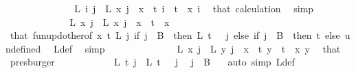 \begin{isabellebody}
\ \ \ \ \ \ \ \ \ \ \isamarkupfalse%
\ \isamarkupfalse%
\ \ {\isachardoublequoteopen}L\ i\ j\ {\isacharequal}{\kern0pt}\ L\ x\ j{\isachardoublequoteclose}\ \ {\isachardoublequoteopen}x\ {\isacharless}{\kern0pt}\ t{\isachardoublequoteclose}\ {\isachardoublequoteopen}i\ {\isacharless}{\kern0pt}\ t{\isachardoublequoteclose}\ \ x\ i\ \isamarkupfalse%
\ that\ calculation\ \isamarkupfalse%
\ simp\isanewline
\ \ \ \ \ \ \ \ \ \ \isamarkupfalse%
\ \isamarkupfalse%
\ {\isachardoublequoteopen}L{\isacharprime}{\kern0pt}\ x\ j\ {\isacharequal}{\kern0pt}\ L\ x\ j{\isachardoublequoteclose}\ \ {\isachardoublequoteopen}x\ {\isacharless}{\kern0pt}\ t{\isachardoublequoteclose}\ \ x\ \isamarkupfalse%
\ that\ fun{\isacharunderscore}{\kern0pt}upd{\isacharunderscore}{\kern0pt}other{\isacharbrackleft}{\kern0pt}of\ x\ t\ L\ {\isachardoublequoteopen}{\isasymlambda}j{\isachardot}{\kern0pt}\ if\ j\ {\isasymin}\ B\ {}\ then\ L\ {\isacharparenleft}{\kern0pt}t\ {\isacharminus}{\kern0pt}\ {}{\isacharparenright}{\kern0pt}\ j\ else\ if\ j\ {\isasymin}\ B\ {}\ then\ t\ else\ undefined{\isachardoublequoteclose}{\isacharbrackright}{\kern0pt}\ \isamarkupfalse%
\ L{\isacharprime}{\kern0pt}{\isacharunderscore}{\kern0pt}def\ \isamarkupfalse%
\ simp\isanewline
\ \ \ \ \ \ \ \ \ \ \isamarkupfalse%
\ \isamarkupfalse%
\ {\isacharasterisk}{\kern0pt}{\isacharcolon}{\kern0pt}\ {\isachardoublequoteopen}L{\isacharprime}{\kern0pt}\ x\ j\ {\isacharequal}{\kern0pt}\ L{\isacharprime}{\kern0pt}\ y\ j{\isachardoublequoteclose}\ \ {\isachardoublequoteopen}x\ {\isacharless}{\kern0pt}\ t{\isachardoublequoteclose}\ {\isachardoublequoteopen}y\ {\isacharless}{\kern0pt}\ t{\isachardoublequoteclose}\ \ x\ y\ \isamarkupfalse%
\ that\ \isamarkupfalse%
\ presburger\isanewline
\isanewline
\ \ \ \ \ \ \ \ \ \ \isamarkupfalse%
\ {\isachardoublequoteopen}L{\isacharprime}{\kern0pt}\ t\ j\ {\isacharequal}{\kern0pt}\ L{\isacharprime}{\kern0pt}\ {\isacharparenleft}{\kern0pt}t\ {\isacharminus}{\kern0pt}\ {}{\isacharparenright}{\kern0pt}\ j{\isachardoublequoteclose}\ \isamarkupfalse%
\ {\isacartoucheopen}j\ {\isasymin}\ B\ {}{\isacartoucheclose}\ \isamarkupfalse%
\ {\isacharparenleft}{\kern0pt}auto\ simp{\isacharcolon}{\kern0pt}\ L{\isacharprime}{\kern0pt}{\isacharunderscore}{\kern0pt}def{\isacharparenright}{\kern0pt}\isanewline

\end{isabellebody}
